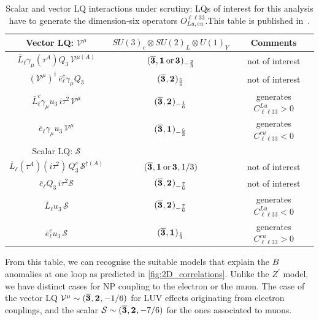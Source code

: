 \begin{table}[!ht]
	\centering
	{
		\begin{tabular}{ccc }
			\toprule
			Vector LQ: $\mathcal{V^\mu}$ & $SU(3)_{c} \otimes SU(2)_{L} \otimes U(1)_{Y}$ & Comments \\
			\midrule
			$ \bar L_\ell  \gamma_\mu (\tau^A) Q_3 \, \mathcal{V}^{\mu (A)} $ & $(\overline{\irrep{3}},\irrep{1}\,\text{or}\,\irrep{3} )_{-{2\over3}}$ & not of interest \\
			$  ( \mathcal{V^\mu} )^{\dagger} \,\bar e_\ell^c  \gamma_\mu Q_3 $ & $(\overline{\irrep{3}},\irrep{2} )_{5\over6}$ & not of interest \\
			$\bar{L}^c_\ell \gamma_\mu u_3\, i\tau^2 \, \mathcal{V^\mu}$ & $(\overline{\irrep{3}},\irrep{2} )_{-{1\over6}}$ & generates $C^{Lu}_{\ell \ell 33} > 0$\\
			$ \overline {e}_\ell \gamma_\mu u_3\, \mathcal{V^\mu}$ & $(\overline{\irrep{3}},\irrep{1} )_{-{5\over3}}$ & generates $C^{eu}_{\ell \ell 33} < 0$ \\    
			\midrule
			Scalar LQ: $\mathcal{S}$ &  &  \\
			\midrule
			$\bar L_\ell (\tau^A) (i \tau^{2}) \, Q_3^{c} \,\mathcal{S}^{\dagger (A)} $ & $(\overline{\irrep{3}},\irrep{1}\,\text{or}\,\irrep{3} ,1/3 )$ & not of interest  \\    
			$\bar e_\ell Q_3 \,  i \tau^2 \mathcal{S} $ & $(\overline{\irrep{3}},\irrep{2} )_{-{7\over6}}$ & not of interest \\
			$\bar L_\ell u_3\, \mathcal{S} $  & $(\overline{\irrep{3}},\irrep{2} )_{-{7\over6}}$  & generates $C^{Lu}_{\ell \ell 33} < 0$ \\
			$\bar e_\ell^c u_3\, \mathcal{S}$ & $(\overline{\irrep{3}},\irrep{1})_{1\over3}$ & generates $C^{eu}_{\ell \ell 33} > 0$ \\
			\bottomrule
		\end{tabular}
	}
	\caption{Scalar and vector LQ interactions under scrutiny: LQs of interest for this analysis have to generate the dimension-six operators $O_{Lu,eu}^{\ell \ell 33}$.This table is published in~\cite{Alasfar:2020mne}.}
	\label{tab:LQmodels}
\end{table}
From this table, we can  recognise the suitable models that explain the $B$ anomalies at one loop as predicted in \autoref{fig:2D_correlations}. Unlike the $Z^\prime$ model, we have distinct cases for NP coupling to the electron or the muon. The case of the vector LQ $ \mathcal V^\mu\sim(\overline{\irrep{3}},\irrep{2}, -1/6 )$ for LUV effects originating from electron couplings, and the scalar $\mathcal S\sim (\overline{\irrep{3}},\irrep{2} ,-7/6 )$ for the ones associated to muons.
